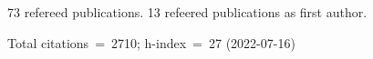 73 refereed publications. 13 refeered publications as first author.

Total citations~=~2710; h-index~=~27 (2022-07-16)